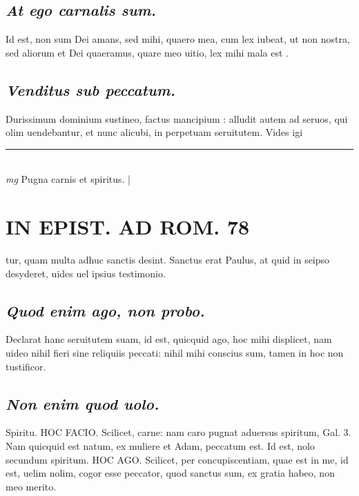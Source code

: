 \documentclass{article}
\begin{document}
\begin{pages}
\subsection*{\textit{At ego carnalis sum. }}\pstart Id est, non sum Dei amans, sed mihi, quaero mea, cum lex iubeat, ut non nostra, sed aliorum et Dei quaeramus, quare meo uitio, lex mihi mala est .   \pend
{}
{}
\subsection*{\textit{Venditus sub peccatum. }}\pstart Durissimum dominium sustineo, factus mancipium : alludit autem ad seruos, qui olim uendebantur, et nunc alicubi, in perpetuam seruitutem. Vides igi\pend
\vspace{0.5cm}\noindent
\vspace{0.2cm}\rule{1cm}{0.2pt}\\ 
\hspace{0.2cm}\textit{mg}
\footnotesize Pugna carnis et spiritus.  
\normalsize| 
\section*{IN EPIST. AD ROM.  78 }
\marginpar{[ p.]}\pstart tur, quam multa adhuc sanctis desint. Sanctus erat Paulus, at quid in seipso desyderet, uides uel ipsius testimonio.  \pend
{}
{}
\subsection*{\textit{Quod enim ago, non probo. }}\pstart Declarat hanc seruitutem suam, id est, quicquid ago, hoc mihi displicet, nam uideo nihil fieri sine reliquiis peccati: nihil mihi conscius sum, tamen in hoc non tustificor.   \pend
{}
{}
\subsection*{\textit{Non enim quod uolo. }}\pstart Spiritu. HOC FACIO. Scilicet, carne: nam caro pugnat aduersus spiritum, Gal. 3. Nam quicquid est natum, ex muliere et Adam, peccatum est.  \pend\pstart Id est, nolo secundum spiritum. HOC AGO.  Scilicet, per concupiscentiam, quae est in me, id est, uelim nolim, cogor esse peccator, quod sanctus sum, ex gratia habeo, non meo merito.   \pend
{}
{}

\end{pages}
\end{document}
